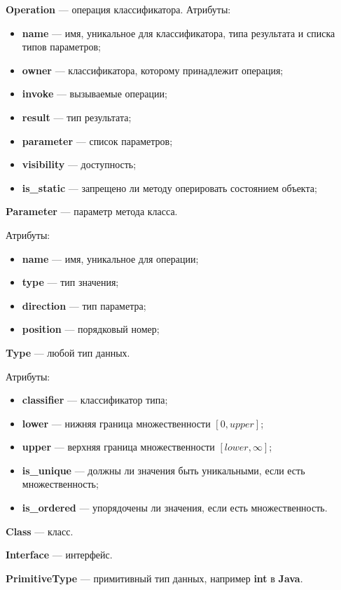 \textbf{Operation} --- операция классификатора.
Атрибуты:
\begin{itemize}
\item \textbf{name} --- имя, уникальное для классификатора, типа результата и списка типов параметров;
\item \textbf{owner} --- классификатора, которому принадлежит операция;
\item \textbf{invoke} --- вызываемые операции;
\item \textbf{result} --- тип результата;
\item \textbf{parameter} --- список параметров;
\item \textbf{visibility} --- доступность;
\item \textbf{is\_static} --- запрещено ли методу оперировать состоянием объекта;
\end{itemize}

\textbf{Parameter} --- параметр метода класса.

Атрибуты:
\begin{itemize}
\item \textbf{name} --- имя, уникальное для операции;
\item \textbf{type} --- тип значения;
\item \textbf{direction} --- тип параметра;
\item \textbf{position} --- порядковый номер;
\end{itemize}

\textbf{Type} --- любой тип данных.

Атрибуты:
\begin{itemize}
\item \textbf{classifier} --- классификатор типа;
\item \textbf{lower} --- нижняя граница множественности $\left [ 0, upper \right ]$;
\item \textbf{upper} --- верхняя граница множественности $\left [ lower, \infty \right ]$;
\item \textbf{is\_unique} --- должны ли значения быть уникальными, если есть множественность;
\item \textbf{is\_ordered} --- упорядочены ли значения, если есть множественность.
\end{itemize}

\textbf{Class} --- класс.

\textbf{Interface} --- интерфейс.

\textbf{PrimitiveType} --- примитивный тип данных, например \textbf{int} в \textbf{Java}.


